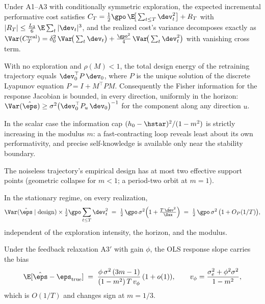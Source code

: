 
\begin{lemma}
Under A1--A3 with conditionally symmetric exploration, the expected
incremental performative cost satisfies
$C_T = \tfrac{1}{2}\gpo\,\E\!\big[\sum_{t\le T}\dev_t^2\big] + R_T$ with
$|R_T| \le \tfrac{L_3}{6}\,\E\sum_t |\dev_t|^3$, and the realized cost's
variance decomposes exactly as
$\Var(C_T^{\mathrm{real}}) = \delta_0^2\,\Var\!\big(\sum_t \dev_t\big)
+ \tfrac{\gpo^2}{4}\,\Var\!\big(\sum_t \dev_t^2\big)$
with vanishing cross term.
\end{lemma}

\begin{theorem}
With no exploration and $\rho(M)<1$, the total design energy of the
retraining trajectory equals $\dev_0^\top P\,\dev_0$, where $P$ is the
unique solution of the discrete Lyapunov equation $P = I + M^\top P M$.
Consequently the Fisher information for the response Jacobian is bounded,
in every direction, uniformly in the horizon:
$\Var(\hat\eps) \ge \sigma^2\big(\dev_0^\top P_u\,\dev_0\big)^{-1}$ for the
component along any direction $u$.
\end{theorem}

\begin{corollary}
In the scalar case the information cap $(h_0-\hstar)^2/(1-m^2)$ is strictly
increasing in the modulus $m$: a fast-contracting loop reveals least about
its own performativity, and precise self-knowledge is available only near
the stability boundary.
\end{corollary}

\begin{corollary}
The noiseless trajectory's empirical design has at most two effective
support points (geometric collapse for $m<1$; a period-two orbit at
$m=1$).
\end{corollary}

\begin{theorem}
In the stationary regime, on every realization,
\[
\Var(\hat\eps \mid \mathrm{design}) \times \tfrac{1}{2}\gpo \sum_{t\le T}
\dev_t^2 \;=\; \tfrac{1}{2}\,\gpo\,\sigma^2\Big(1 +
\tfrac{T\,\bar{\dev}^2}{\Sxx}\Big)
\;=\; \tfrac{1}{2}\,\gpo\,\sigma^2\,\big(1 + O_P(1/T)\big),
\]
independent of the exploration intensity, the horizon, and the modulus.
\end{theorem}

\begin{proposition}
Under the feedback relaxation A3$'$ with gain $\phi$, the OLS response
slope carries the bias
\[
\E[\hat\eps - \eps_{\mathrm{true}}] \;=\;
\frac{\phi\,\sigma^2\,(3m-1)}{(1-m^2)\,T\,v_\phi}\,(1+o(1)),
\qquad v_\phi = \frac{\sigma_e^2 + \phi^2\sigma^2}{1-m^2},
\]
which is $O(1/T)$ and changes sign at $m = 1/3$.
\end{proposition}

